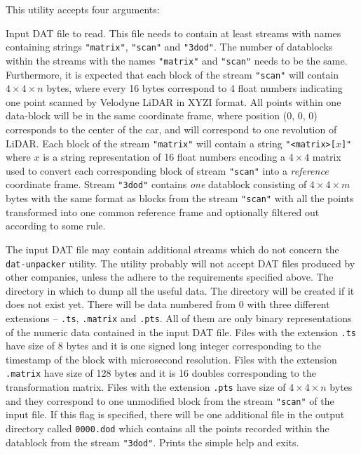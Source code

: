 This utility accepts four arguments:
\begin{description}
 Input DAT file to read. This file needs to contain at least streams with names containing strings \texttt{"matrix"}, \texttt{"scan"} and \texttt{"3dod"}. The number of datablocks within the streams with the names \texttt{"matrix"} and \texttt{"scan"} needs to be the same. Furthermore, it is expected that each block of the stream \texttt{"scan"} will contain $4\times4\times n$ bytes, where every 16 bytes correspond to 4 float numbers indicating one point scanned by Velodyne LiDAR in XYZI format. All points within one data-block will be in the same coordinate frame, where position (0, 0, 0) corresponds to the center of the car, and will correspond to one revolution of LiDAR. Each block of the stream \texttt{"matrix"} will contain a string \texttt{"<matrix>[}$x$\texttt{]"} where $x$ is a string representation of 16 float numbers encoding a $4\times4$ matrix used to convert each corresponding block of stream \texttt{"scan"} into a {\em reference} coordinate frame. Stream \texttt{"3dod"} contains {\em one} datablock consisting of $4\times4\times m$ bytes with the same format as blocks from the stream \texttt{"scan"} with all the points transformed into one common reference frame and optionally filtered out according to some rule.

The input DAT file may contain additional streams which do not concern the \texttt{dat-unpacker} utility. The utility probably will not accept DAT files produced by other companies, unless the adhere to the requirements specified above.
 The directory in which to dump all the useful data. The directory will be created if it does not exist yet. There will be data numbered from 0 with three different extensions -- \texttt{.ts}, \texttt{.matrix} and \texttt{.pts}. All of them are only binary representations of the numeric data contained in the input DAT file. Files with the extension \texttt{.ts} have size of 8 bytes and it is one signed long integer corresponding to the timestamp of the block with microsecond resolution. Files with the extension \texttt{.matrix} have size of 128 bytes and it is 16 doubles corresponding to the transformation matrix. Files with the extension \texttt{.pts} have size of $4\times4\times n$ bytes and they correspond to one unmodified block from the stream \texttt{"scan"} of the input file.
 If this flag is specified, there will be one additional file in the output directory called \texttt{0000.dod} which contains all the points recorded within the datablock from the stream \texttt{"3dod"}.
 Prints the simple help and exits.
\end{description}


